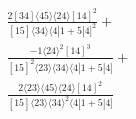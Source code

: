 \documentclass[varwidth, border=5pt]{standalone}
\begin{document}
\begin{my}
$\begin{gathered}
\scriptscriptstyle\frac{2[34]⟨45⟩⟨24⟩[14]^2}{[15]⟨34⟩⟨4|1+5|4]^2}+\\
\scriptscriptstyle\frac{-1⟨24⟩^2[14]^3}{[15]^2⟨23⟩⟨34⟩⟨4|1+5|4]}+\\
\scriptscriptstyle\frac{2⟨23⟩⟨45⟩⟨24⟩[14]^2}{[15]⟨23⟩⟨34⟩^2⟨4|1+5|4]}\phantom{+}
\end{gathered}$
\end{my}
\end{document}
